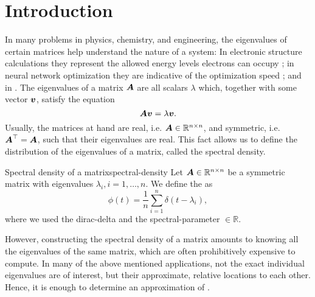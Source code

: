 \chapter{Introduction}
\label{chp:1-introduction}

In many problems in physics, chemistry, and engineering, 
the eigenvalues of certain matrices help understand the nature of a system:
In electronic structure calculations they represent the allowed energy levels 
electrons can occupy \cite{ducastelle1970charge, haydock1972electronic, lin2017randomized};
in neural network optimization they are indicative of the optimization speed \cite{ghorbani2019investigation};
and in .
The eigenvalues of a matrix $\boldsymbol{A}$ are all scalars $\lambda$ which, together
with some vector $\boldsymbol{v}$, satisfy the equation
\begin{equation}
    \boldsymbol{A} \boldsymbol{v} = \lambda \boldsymbol{v}.
    \label{equ:1-introduction-eigenvalue}
\end{equation}
Usually, the matrices at hand are real, i.e. $\boldsymbol{A} \in \mathbb{R}^{n \times n}$,
and symmetric, i.e. $\boldsymbol{A}^{\top} = \boldsymbol{A}$, such that their eigenvalues are
real. This fact allows us to define the distribution of the eigenvalues of a
matrix, called the spectral density.

\begin{definition}{Spectral density of a matrix}{spectral-density}
    Let $\boldsymbol{A} \in \mathbb{R}^{n \times n}$ be a symmetric matrix with eigenvalues $\lambda_i, i=1, \dots, n$.
    We define the  as
    \begin{equation}
        \phi(t) = \frac{1}{n} \sum_{i=1}^{n} \delta(t - \lambda_i),
        \label{equ:1-introduction-def-spectral-density}
    \end{equation}
    where we used the \gls{dirac-delta} \cite[Chapter~15]{dirac1947quantum}
    and the \gls{spectral-parameter} $\in \mathbb{R}$.
\end{definition}


However, constructing the spectral density of a matrix amounts to knowing all
the eigenvalues of the same matrix, which are often prohibitively expensive to
compute. In many of the above mentioned applications, not the exact individual
eigenvalues are of interest, but their approximate, relative locations to each
other. Hence, it is enough to determine an approximation of .

